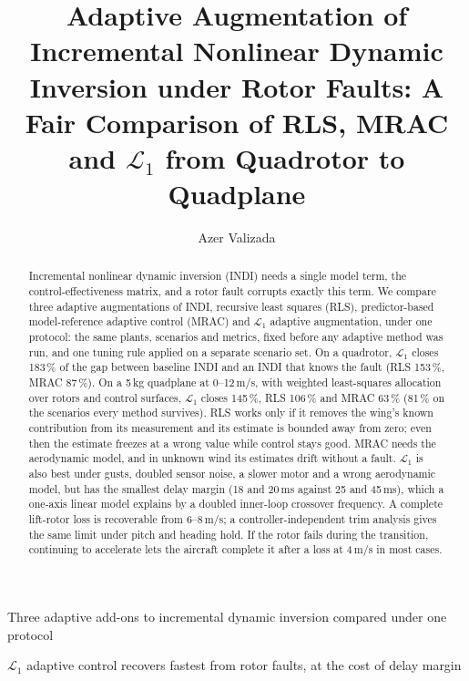 \documentclass[preprint,12pt,a4paper]{elsarticle}
\begin{document}
\begin{frontmatter}
\title{Adaptive Augmentation of Incremental Nonlinear Dynamic Inversion under Rotor Faults:
A Fair Comparison of RLS, MRAC and $\mathcal{L}_1$ from Quadrotor to Quadplane}
\author{Azer Valizada}
\begin{abstract}
Incremental nonlinear dynamic inversion (INDI) needs a single model term, the control-effectiveness matrix, and a rotor fault
corrupts exactly this term. We compare three adaptive augmentations of INDI, recursive least squares (RLS), predictor-based
model-reference adaptive control (MRAC) and $\mathcal{L}_1$ adaptive augmentation, under one protocol: the same plants, scenarios and
metrics, fixed before any adaptive method was run, and one tuning rule applied on a separate scenario set. On a quadrotor,
$\mathcal{L}_1$ closes 183\,\% of the gap between baseline INDI and an INDI that knows the fault (RLS 153\,\%, MRAC 87\,\%). On a
5\,kg quadplane at 0--12\,m/s, with weighted least-squares allocation over rotors and control surfaces, $\mathcal{L}_1$ closes 145\,\%,
RLS 106\,\% and MRAC 63\,\% (81\,\% on the scenarios every method survives). RLS works only if it removes the wing's known
contribution from its measurement and its estimate is bounded away from zero; even then the estimate freezes at a wrong value while
control stays good. MRAC needs the aerodynamic model, and in unknown wind its estimates drift without a fault. $\mathcal{L}_1$ is also
best under gusts, doubled sensor noise, a slower motor and a wrong aerodynamic model, but has the smallest delay margin (18 and
20\,ms against 25 and 45\,ms), which a one-axis linear model explains by a doubled inner-loop crossover frequency. A complete
lift-rotor loss is recoverable from 6--8\,m/s; a controller-independent trim analysis gives the same limit under pitch and heading
hold. If the rotor fails during the transition, continuing to accelerate lets the aircraft complete it after a loss at 4\,m/s in
most cases.
\end{abstract}
\begin{highlights}
\item Three adaptive add-ons to incremental dynamic inversion compared under one protocol
\item $\mathcal{L}_1$ adaptive control recovers fastest from rotor faults, at the cost of delay margin

\end{highlights}
\end{frontmatter}
\end{document}
